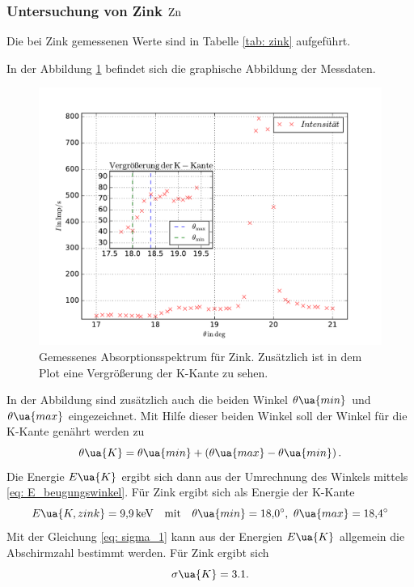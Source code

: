 \subsubsection{Untersuchung von Zink $\ce{Zn}$}\label{sec: zink}
Die bei Zink gemessenen Werte sind in Tabelle \ref{tab: zink} aufgeführt.

In der Abbildung \ref{fig: absotp_zink} befindet sich die graphische Abbildung der Messdaten.
\begin{figure}
  \centering
  \includegraphics[width=1\textwidth]{../Messdaten/zink.pdf}
  \caption{Gemessenes Absorptionsspektrum für Zink. Zusätzlich ist in dem Plot eine Vergrößerung der K-Kante zu sehen.} %
  \label{fig: absotp_zink}
\end{figure}
In der Abbildung sind zusätzlich auch die beiden Winkel $\theta\ua{min}$ und $\theta\ua{max}$
eingezeichnet. Mit Hilfe dieser beiden Winkel soll der Winkel für die K-Kante genährt werden zu %
\begin{equation}
  \label{eq:theta_k}
  \theta\ua{K}=\theta\ua{min}+\left(\theta\ua{max}-\theta\ua{min}\right).
\end{equation}
Die Energie $E\ua{K}$ ergibt sich dann aus der Umrechnung des Winkels mittels \eqref{eq: E_beugungswinkel}.
Für Zink ergibt sich als Energie der K-Kante
\begin{equation*}
  E\ua{K,zink}=\SI{9.9}{\kilo\eV} \quad \text{mit}\quad \theta\ua{min}=\SI{18.0}{\degree},\, \,   \theta\ua{max}=\SI{18.4}{\degree}
\end{equation*}
Mit der Gleichung \eqref{eq: sigma_1} kann aus der Energien $E\ua{K}$ allgemein die Abschirmzahl
bestimmt werden.
Für Zink ergibt sich
\begin{equation}
  \label{eq: abschirm_zink}
  \sigma\ua{K}=3.1.
\end{equation}
\FloatBarrier
\FloatBarrier
